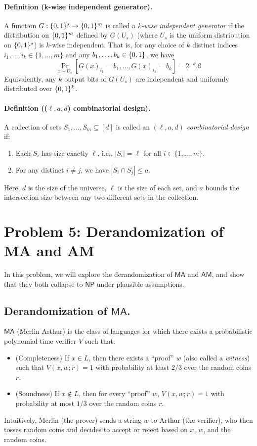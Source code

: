 \documentclass[12pt]{article}
\begin{document}
\paragraph{Definition (k-wise independent generator).}
A function $G: \{0,1\}^s \to \{0,1\}^m$ is called a \emph{$k$-wise independent generator} if the distribution on $\{0,1\}^m$ defined by $G(U_s)$ (where $U_s$ is the uniform distribution on $\{0,1\}^s$) is $k$-wise independent. That is, for any choice of $k$ distinct indices $i_1, \ldots, i_k \in \{1,\ldots, m\}$ and any $b_1, \ldots, b_k \in \{0,1\}$, we have
\[
\Pr_{x \sim U_s} \left[G(x)_{i_1} = b_1, \ldots, G(x)_{i_k} = b_k \right] = 2^{-k}.ß
\]
Equivalently, any $k$ output bits of $G(U_s)$ are independent and uniformly distributed over $\{0,1\}^k$.

\paragraph{Definition (($\ell, a, d$) combinatorial design).}
A collection of sets $S_1, \ldots, S_m \subseteq [d]$ is called an \emph{$(\ell, a, d)$ combinatorial design} if:
\begin{enumerate}
    \item Each $S_i$ has size exactly $\ell$, i.e., $|S_i| = \ell$ for all $i \in \{1, \ldots, m\}$.
    \item For any distinct $i \neq j$, we have $|S_i \cap S_j| \leq a$.
\end{enumerate}
Here, $d$ is the size of the universe, $\ell$ is the size of each set, and $a$ bounds the intersection size between any two different sets in the collection.

\newpage

\section{Problem 5: Derandomization of MA and AM}

In this problem, we will explore the derandomization of $\mathsf{MA}$ and $\mathsf{AM}$, and show that they both collapse to $\mathsf{NP}$ under plausible assumptions.

\subsection{Derandomization of $\mathsf{MA}$.}
$\mathsf{MA}$ (Merlin-Arthur) is the class of languages for which there exists a probabilistic polynomial-time verifier $V$ such that:
\begin{itemize}
    \item (Completeness) If $x \in L$, then there exists a ``proof'' $w$ (also called a \emph{witness}) such that $V(x, w; r) = 1$ with probability at least $2/3$ over the random coins $r$.
    \item (Soundness) If $x \notin L$, then for every ``proof'' $w$, $V(x, w; r) = 1$ with probability at most $1/3$ over the random coins $r$.
\end{itemize}
Intuitively, Merlin (the prover) sends a string $w$ to Arthur (the verifier), who then tosses random coins and decides to accept or reject based on $x$, $w$, and the random coins.
\end{document}

